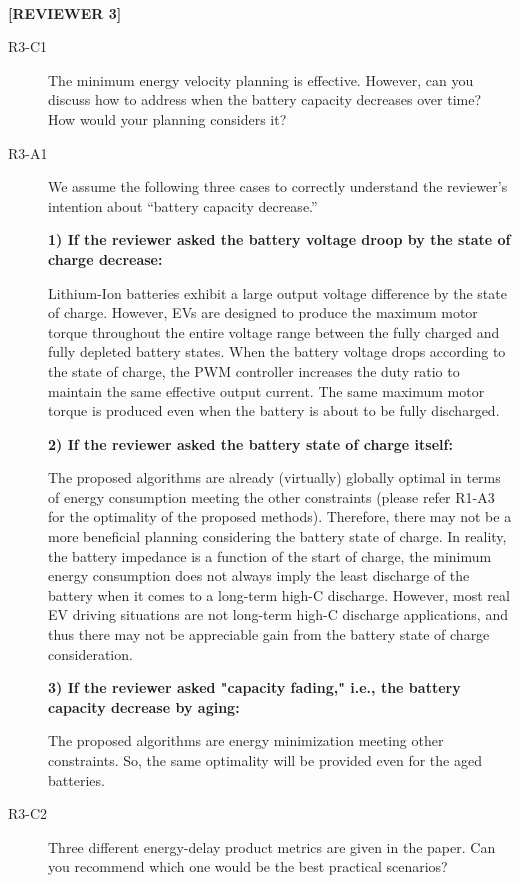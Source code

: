 \documentclass[onecolumn]{IEEEconf}
\begin{document}
~
\newpage

\textbf{[REVIEWER 3]}
\begin{description}

\item [R3-C1] The minimum energy velocity planning is effective. However, can you discuss how to address when the battery capacity decreases over time? How would your planning considers it?

\item [R3-A1] We assume the following three cases to correctly understand  the reviewer's intention about ``battery capacity decrease.''

\textbf{1) If the reviewer asked the battery voltage droop by the state of charge decrease:}

Lithium-Ion batteries exhibit a large output voltage difference by the state of charge. However, EVs are designed to produce the maximum motor torque throughout  the entire voltage range between the fully charged and fully depleted battery states. When the battery voltage drops according to the state of charge, the PWM controller increases the duty ratio to maintain the same effective output current. The same maximum motor torque is produced even when the battery is about to be fully discharged.

\textbf{2) If the reviewer asked the battery state of charge itself:}

The proposed  algorithms are already (virtually) globally optimal in terms of energy consumption meeting the other constraints (please refer R1-A3 for the optimality of the proposed methods). Therefore, there may not be a more beneficial planning considering the battery state of charge. In reality, the battery impedance is a function of the start of charge, the minimum energy consumption does not always imply the least discharge of the battery when it comes to a long-term high-C discharge. However, most real EV driving situations are not  long-term high-C discharge applications, and thus there may not be appreciable gain from the battery state of charge consideration.

\textbf{3) If the reviewer asked "capacity fading," i.e., the battery capacity decrease by aging:}

The proposed algorithms are energy minimization meeting other constraints. So, the same optimality will be provided even for the aged batteries. 

\item [R3-C2] Three different energy-delay product metrics are given in the paper. Can you recommend which one would be the best practical scenarios?


\end{description}
\end{document}
